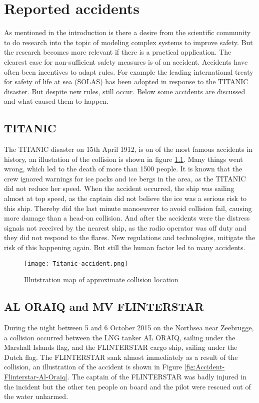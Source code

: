 \chapter{Reported accidents}
\label{sec:accidents}
As mentioned in the introduction is there a desire from the scientific community to do research into the topic of modeling complex systems to improve safety. But the research becomes more relevant if there is a practical application. The clearest case for non-sufficient safety measures is of an accident. Accidents have often been incentives to adapt rules. For example the leading international treaty for safety of life at sea (\ac{SOLAS}) has been adopted in response to the TITANIC disaster. But despite new rules, still occur. Below some accidents are discussed and what caused them to happen.

\section{TITANIC}
The TITANIC disaster on 15th April 1912, is on of the most famous accidents in history, an illustation of the collision is shown in figure \ref{fig:Accident-Titanic}. Many things went wrong, which led to the death of more than 1500 people. It is known that the crew ignored warnings for ice packs and ice bergs in the area, as the TITANIC did not reduce her speed. When the accident occurred, the ship was sailing almost at top speed, as the captain did not believe the ice was a serious risk to this ship. Thereby did the last minute manoeuvrer to avoid collision fail, causing more damage than a head-on collision. And after the accidents were the distress signals not received by the nearest ship, as the radio operator was off duty and they did not respond to the flares. New regulations and technologies, mitigate the risk of this happening again. But still the human factor led to many accidents.

\begin{figure}[H]
	\centering
	\texttt{[image: Titanic-accident.png]}
	\caption{Illutstration map of approximate collision location}
	\label{fig:Accident-Titanic}
\end{figure}

\newpage
\section{AL ORAIQ and MV FLINTERSTAR}
During the night between 5 and 6 October 2015 on the Northsea near Zeebrugge, a collision occurred between the LNG tanker AL ORAIQ, sailing under the Marshall Islands flag, and the FLINTERSTAR cargo ship, sailing under the Dutch flag. The FLINTERSTAR sank almost immediately as a result of the collision, an illustration of the accident is shown in Figure \ref{fig:Accident-Flinterstar-Al-Oraiq}. The captain of the FLINTERSTAR was badly injured in the incident but the other ten people on board and the pilot were rescued out of the water unharmed.

